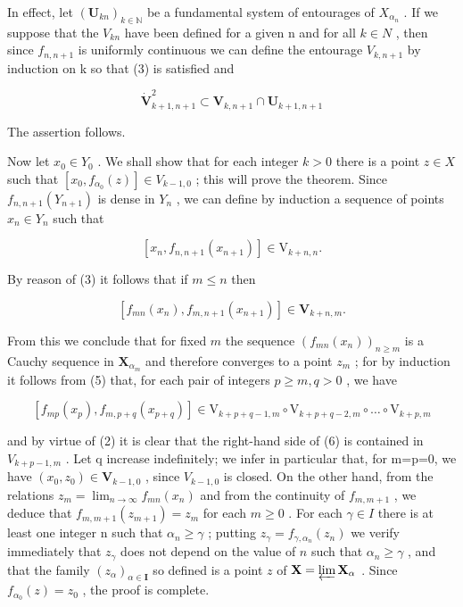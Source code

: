 In effect, let \((\mathbf{U}_{kn})_{k\in\mathbb{N}}\) be a fundamental system of entourages of \(X_{\alpha_{n}}\) . If we suppose that the \(V_{kn}\) have been defined for a given n and for all \(k\in N\) , then since \(f_{n,n+1}\) is uniformly continuous we can define the entourage \(V_{k,n+1}\) by induction on k so that (3) is satisfied and

\[
\mathbf {\dot {V}} _ {k + 1, n + 1} ^ {2} \subset \mathbf {V} _ {k, n + 1} \cap \mathbf {U} _ {k + 1, n + 1}
\]

The assertion follows.

Now let \(x_0 \in Y_0\) . We shall show that for each integer \(k > 0\) there is a point \(z \in X\) such that \([x_0, f_{\alpha_0}(z)] \in V_{k-1,0}\) ; this will prove the theorem. Since \(f_{n,n+1}(Y_{n+1})\) is dense in \(Y_n\) , we can define by induction a sequence of points \(x_n \in Y_n\) such that

\[
\left[ x _ {n}, f _ {n, n + 1} \left(x _ {n + 1}\right) \right] \in \mathrm{V} _ {k + n, n}.\tag{4}
\]

By reason of (3) it follows that if \(m \leqslant n\) then

\[
\left[ f _ {m n} (x _ {n}), f _ {m, n + 1} (x _ {n + 1}) \right] \in \mathbf {V} _ {k + n, m}.\tag{5}
\]

From this we conclude that for fixed \(m\) the sequence \((f_{mn}(x_n))_{n\geqslant m}\) is a Cauchy sequence in \(\mathbf{X}_{\alpha_m}\) and therefore converges to a point \(z_m\) ; for by induction it follows from (5) that, for each pair of integers \(p\geqslant m,q > 0\) , we have

\[
\left[ f _ {m p} (x _ {p}), f _ {m, p + q} (x _ {p + q}) \right] \in \mathrm{V} _ {k + p + q - 1, m} \circ \mathrm{V} _ {k + p + q - 2, m} \circ \dots \circ \mathrm{V} _ {k + p, m}\tag{6}
\]

and by virtue of (2) it is clear that the right-hand side of (6) is contained in \(V_{k+p-1,m}\) . Let q increase indefinitely; we infer in particular that, for m=p=0, we have \((x_{0},z_{0})\in\mathbf{V}_{k-1,0}\) , since \(V_{k-1,0}\) is closed. On the other hand, from the relations \(z_{m}=\lim_{n\to\infty}f_{mn}(x_{n})\) and from the continuity of \(f_{m,m+1}\) , we deduce that \(f_{m,m+1}(z_{m+1})=z_{m}\) for each \(m\geqslant0\) . For each \(\gamma\in I\) there is at least one integer n such that \(\alpha_{n}\geqslant\gamma\) ; putting \(z_{\gamma} = f_{\gamma, \alpha_n}(z_n)\) we verify immediately that \(z_{\gamma}\) does not depend on the value of \(n\) such that \(\alpha_n \geqslant \gamma\) , and that the family \((z_\alpha)_{\alpha \in \mathbf{I}}\) so defined is a point \(z\) of \(\mathbf{X} = \varprojlim \mathbf{X}_\alpha\) . Since \(f_{\alpha_0}(z) = z_0\) , the proof is complete.

